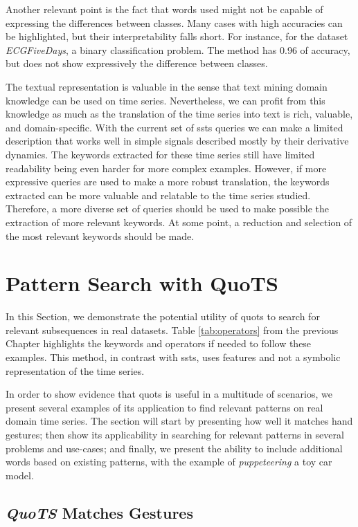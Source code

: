Another relevant point is the fact that words used might not be capable of expressing the differences between classes. Many cases with high accuracies can be highlighted, but their interpretability falls short. For instance, for the dataset \textit{ECGFiveDays}, a binary classification problem. The method has 0.96 of accuracy, but does not show expressively the difference between classes.
\par
The textual representation is valuable in the sense that text mining domain knowledge can be used on time series. Nevertheless, we can profit from this knowledge as much as the translation of the time series into text is rich, valuable, and domain-specific. With the current set of \gls{ssts} queries we can make a limited description that works well in simple signals described mostly by their derivative dynamics. The keywords extracted for these time series still have limited readability being even harder for more complex examples. However, if more expressive queries are used to make a more robust translation, the keywords extracted can be more valuable and relatable to the time series studied. Therefore, a more diverse set of queries should be used to make possible the extraction of more relevant keywords. At some point, a reduction and selection of the most relevant keywords should be made.

\section{Pattern Search with QuoTS}

In this Section, we demonstrate the potential utility of \gls{quots} to search for relevant subsequences in real datasets. Table \ref{tab:operators} from the previous Chapter highlights the keywords and operators if needed to follow these examples. This method, in contrast with \gls{ssts}, uses features and not a symbolic representation of the time series.
\par
In order to show evidence that \gls{quots} is useful in a multitude of scenarios, we present several examples of its application to find relevant patterns on real domain time series. The section will start by presenting how well it matches hand gestures; then show its applicability in searching for relevant patterns in several problems and use-cases; and finally, we present the ability to include additional words based on existing patterns, with the example of \textit{puppeteering} a toy car model.

\subsection{\textit{QuoTS} Matches Gestures}


